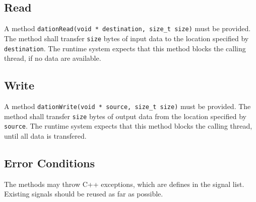 \subsection{Read}
A method \verb|dationRead(void * destination, size_t size)|
must be provided. The method shall transfer \verb|size| bytes of
input data to the location specified by \verb|destination|.
The runtime system expects that this method blocks the calling thread,
if no data are available.

\subsection{Write}
A method \verb|dationWrite(void * source, size_t size)|
must be provided. The method shall transfer \verb|size| bytes of
output data from the location specified by \verb|source|.
The runtime system expects that this method blocks the calling thread,
until all data is transfered.

\subsection{Error Conditions}
The methods may throw C++ exceptions, which are defines in the signal list.
Existing signals should be reused as far as possible.

